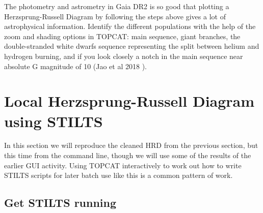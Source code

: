 \documentclass{article}
\newcommand{\winfig}[2]
           {\vspace*{-0.5cm}
            \hspace*{0.5cm}\mbox{\vtop{\hbox{\texttt{[image: \#2]}}}}}
\begin{document}
\begin{minipage}[t]{11cm}
  \raggedright
  The photometry and astrometry in Gaia DR2 is so good that plotting
  a Herzsprung-Russell Diagram by following the steps above gives
  a lot of astrophysical information.
  Identify the different populations with the help of the zoom and
  shading options in TOPCAT: main sequence, giant branches,
  the double-stranded white dwarfs sequence representing the
  split between helium and hydrogen burning, and if you look
  closely a notch in the main sequence near absolute G magnitude of 10
  (Jao et al 2018 \cite{2018ApJ...861L..11J}).
\end{minipage}
\begin{minipage}[t]{8cm}
  \vspace*{-1.5cm}
  \winfig{width=8cm}{hrd_only.png}
\end{minipage}

\newpage

\section{Local Herzsprung-Russell Diagram using STILTS}

In this section we will reproduce the cleaned HRD from the previous section,
but this time from the command line, though we will use some of the results
of the earlier GUI activity.
Using TOPCAT interactively to work out how to write STILTS scripts
for later batch use like this is a common pattern of work.

\subsection{Get STILTS running}
\end{document}
